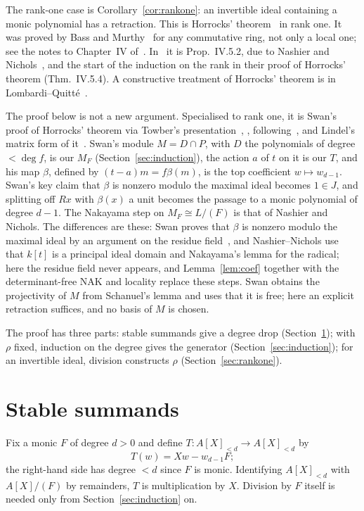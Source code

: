 \documentclass[11pt]{amsart}
\theoremstyle{remark}
\begin{document}
The rank-one case is Corollary~\ref{cor:rankone}: an invertible ideal
containing a monic polynomial has a retraction. This is Horrocks'
theorem~\cite{Hor} in rank one. It was proved by Bass and Murthy~\cite{BM}
for any commutative ring, not only a local one; see the notes to Chapter~IV
of~\cite{Lam}. In~\cite[Ch.~IV, \S5]{Lam} it is Prop.~IV.5.2, due to
Nashier and Nichols~\cite{NN}, and the start of the induction on the rank
in their proof of Horrocks' theorem (Thm.~IV.5.4). A constructive treatment
of Horrocks' theorem is in Lombardi--Quitt\'e~\cite{LQ}.

The proof below is not a new argument. Specialised to rank one, it is
Swan's proof of Horrocks' theorem via Towber's presentation~\cite[\S IV.3]{Lam78},
\cite[\S IV.3]{Lam}, following~\cite{Fer}, and Lindel's matrix form of
it~\cite{Lin}. Swan's module $M=D\cap P$, with $D$ the polynomials of degree
$<\deg f$, is our $M_F$ (Section~\ref{sec:induction}), the action $a$ of $t$
on it is our $T$, and his map $\beta$, defined by $(t-a)m=f\beta(m)$, is the
top coefficient $w\mapsto w_{d-1}$. Swan's key claim that $\beta$ is nonzero
modulo the maximal ideal becomes $1\in J$, and splitting off $Rx$ with
$\beta(x)$ a unit becomes the passage to a monic polynomial of degree $d-1$.
The Nakayama step on $M_F\cong L/(F)$ is that of Nashier and Nichols. The
differences are these: Swan proves that $\beta$ is nonzero modulo the maximal
ideal by an argument on the residue field~\cite[IV.3.4]{Lam78}, and
Nashier--Nichols use that $k[t]$ is a principal ideal domain and Nakayama's
lemma for the radical; here the residue field never appears, and
Lemma~\ref{lem:coef} together with the determinant-free NAK and locality
replace these steps. Swan obtains the projectivity of $M$ from Schanuel's
lemma and uses that it is free; here an explicit retraction suffices, and
no basis of $M$ is chosen.

The proof has three parts: stable summands give a degree drop
(Section~\ref{sec:stable}); with $\rho$ fixed, induction on the degree gives
the generator (Section~\ref{sec:induction}); for an invertible ideal,
division constructs $\rho$ (Section~\ref{sec:rankone}).

\section{Stable summands}\label{sec:stable}

Fix a monic $F$ of degree $d>0$ and define $T:A[X]_{<d}\to A[X]_{<d}$ by
\[
T(w)=Xw-w_{d-1}F;
\]
the right-hand side has degree $<d$ since $F$ is monic. Identifying
$A[X]_{<d}$ with $A[X]/(F)$ by remainders, $T$ is multiplication by $X$.
Division by $F$ itself is needed only from Section~\ref{sec:induction} on.
\end{document}

